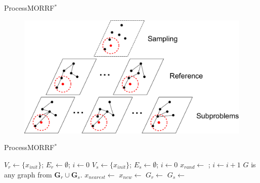 \begin{frame}{Process}{MORRF$^{*}$}
\begin{figure}
	\centering
	\includegraphics[width=.8\linewidth]{figure/MORRTstar.pdf}
	\label{fig:morrt:process}
\end{figure}
\end{frame}

\begin{frame}{Process}{MORRF$^{*}$}
	\begin{algorithmic}[1]
		\State $ V_{r} \leftarrow \{ x_{init} \} $; $ E_{r} \leftarrow \emptyset $; $ i \leftarrow 0 $
		\EndFor
		\State $ V_{s} \leftarrow \{ x_{init} \} $; $ E_{s} \leftarrow \emptyset $; $ i \leftarrow 0 $
		\EndFor
		\State $ x_{rand} \leftarrow $  ; $ i \leftarrow i + 1 $
		\State $G$ is any graph from ${\mathbf G}_r\cup {\mathbf G}_s$.
		\State $ x_{nearest} \leftarrow $ 
		\State $ x_{new} \leftarrow $ 
		\State $ G_{r} \leftarrow $ 
		\EndFor
		\State $ G_{s} \leftarrow $ 
		\EndFor
		\EndIf
		\EndWhile
	\end{algorithmic}
\end{frame}

